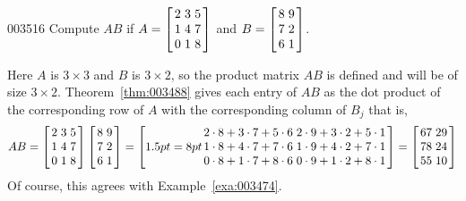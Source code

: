 \begin{example}{}{003516}
Compute $AB$ if $A = \leftB \begin{array}{rrr}
2 & 3 & 5 \\
1 & 4 & 7 \\
0 & 1 & 8
\end{array} \rightB$
 and $B = \leftB \begin{array}{rr}
 8 & 9 \\
 7 & 2 \\
 6 & 1
 \end{array} \rightB$.


\begin{solution}
  Here $A$ is $3 \times 3$ and $B$ is $3 \times 2$, so the product matrix $AB$ is defined and will be of size $3 \times 2$. Theorem~\ref{thm:003488} gives each entry of $AB$ as the dot product of the corresponding row of $A$ with the corresponding column of $B_{j}$ that is,
\begin{equation*}
AB = \leftB \begin{array}{rrr}
2 & 3 & 5 \\
1 & 4 & 7 \\
0 & 1 & 8
\end{array} \rightB \leftB \begin{array}{rr}
8 & 9 \\
7 & 2 \\
6 & 1
\end{array} \rightB = \leftB \arraycolsep=8pt \begin{array}{cc}
2 \cdot 8 + 3 \cdot 7 + 5 \cdot 6 & 2 \cdot 9 + 3 \cdot 2 + 5 \cdot 1 \\
1 \cdot 8 + 4 \cdot 7 + 7 \cdot 6 & 1 \cdot 9 + 4 \cdot 2 + 7 \cdot 1 \\
0 \cdot 8 + 1 \cdot 7 + 8 \cdot 6 & 0 \cdot 9 + 1 \cdot 2 + 8 \cdot 1
\end{array} \rightB = \leftB \begin{array}{rr}
67 & 29 \\
78 & 24 \\
55 & 10
\end{array} \rightB
\end{equation*}
Of course, this agrees with Example~\ref{exa:003474}.
\end{solution}
\end{example}


